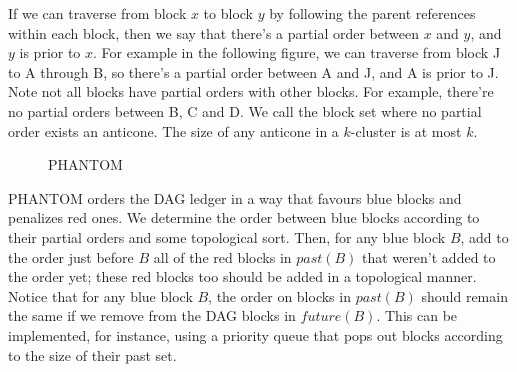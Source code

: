 \documentclass[a4paper,11pt]{article}
\begin{document}
If we can traverse from block $x$ to block $y$ by following the parent
references within each block, then we say that there's a partial order between
$x$ and $y$, and $y$ is prior to $x$. For example in the following figure, we
can traverse from block J to A through B, so there's a partial order between A
and J, and A is prior to J. Note not all blocks have partial orders with other
blocks. For example, there're no partial orders between B, C and D. We call the
block set where no partial order exists an anticone. The size of any anticone in
a $k$-cluster is at most $k$.

\begin{figure}[h]
	\centerline{%
	}
\caption{PHANTOM}
\end{figure}

PHANTOM orders the DAG ledger in a way that favours blue blocks and penalizes
red ones. We determine the order between blue blocks according to their partial
orders and some topological sort. Then, for any blue block $B$, add to the order
just before $B$ all of the red blocks in $past(B)$ that weren’t added to the
order yet; these red blocks too should be added in a topological manner. Notice
that for any blue block $B$, the order on blocks in $past(B)$ should remain the
same if we remove from the DAG blocks in $future(B)$. This can be implemented,
for instance, using a priority queue that pops out blocks according to the size
of their past set.
\end{document}
